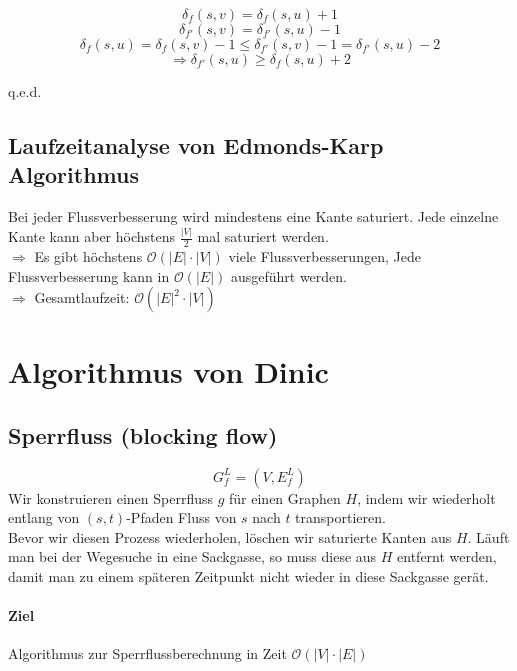 \[ \delta_f(s,v) = \delta_f(s,u)+1 \]
\[ \delta_{f'}(s,v)=\delta_{f'}(s,u)-1 \]
\[ \delta_f(s,u)=\delta_f(s,v)-1 \leq \delta_{f'}(s,v)-1=\delta_{f'}(s,u)-2 \]
\[ \Rightarrow \delta_{f'}(s,u)\geq \delta_f(s,u)+2 \]
\begin{flushright}
	q.e.d.
\end{flushright}
\subsection{Laufzeitanalyse von Edmonds-Karp Algorithmus}
Bei jeder Flussverbesserung wird mindestens eine Kante saturiert. Jede einzelne Kante kann aber höchstens $\frac{|V|}{2}$ mal saturiert werden.\\
$\Rightarrow$ Es gibt höchstens $\mathcal{O}(|E|\cdot|V|)$ viele Flussverbesserungen, Jede Flussverbesserung kann in $\mathcal{O}(|E|)$ ausgeführt werden.\\
$\Rightarrow$ Gesamtlaufzeit: $\mathcal{O}(|E|^2\cdot|V|)$
\section{Algorithmus von Dinic}
\subsection{Sperrfluss (blocking flow)}
\[ G^L_f=(V,E^L_f) \]
Wir konstruieren einen Sperrfluss $g$ für einen Graphen $H$, indem wir wiederholt entlang von $(s,t)$-Pfaden Fluss von $s$ nach $t$ transportieren.\\
Bevor wir diesen Prozess wiederholen, löschen wir saturierte Kanten aus $H$. Läuft man bei der Wegesuche in eine Sackgasse, so muss diese aus $H$ entfernt werden, damit man zu einem späteren Zeitpunkt nicht wieder in diese Sackgasse gerät.
\paragraph{Ziel}
Algorithmus zur Sperrflussberechnung in Zeit $\mathcal{O}(|V|\cdot|E|)$